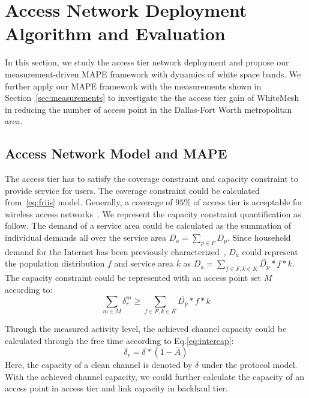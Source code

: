 \section{Access Network Deployment Algorithm and Evaluation}
\label{sec:winmee}

In this section, we study the access tier network deployment and propose our measurement-driven MAPE framework with dynamics 
of white space bands. We further apply our MAPE framework with the measurements shown in Section~\ref{sec:measurements}
to investigate the the access tier gain of WhiteMesh in reducing the number of access point in the Dallas-Fort Worth metropolitan area.

\subsection{Access Network Model and MAPE} 
\label{subsec:winmeemodel}


The access tier has to satisfy the coverage constraint and capacity constraint to provide service for users.
The coverage constraint could be calculated from~\ref{eq:friis} model. Generally, a coverage of $95\%$ of 
access tier is acceptable for wireless access networks~\cite{robinson2010deploying}. We represent the capacity 
constraint quantification as follow. The demand of a service area could be calculated as the 
summation of individual demands all over the service area $D_a=\sum\limits_{p\in P} D_p$. Since household demand 
for the Internet has been previously characterized~\cite{rosston2011household}, $D_a$ could represent the 
population distribution $f$ and service area $k$ as $D_a=\sum\limits_{f \in F,k \in K}\bar{D_p}*f*k$. The capacity 
constraint could be represented with an access point set $M$ according to:
\begin{equation}
\label{eq:nlbound}
\sum_{m \in M}\delta_r^m \ge \sum_{f \in F,k \in K}\bar{D_p}*f*k
\end{equation}


Through the measured activity level, the achieved channel capacity could be calculated through the
free time according to Eq.\ref{eq:intercap}:
\begin{equation}
\label{eq:intercap}
\delta_r=\delta*(1-\bar{A})
\end{equation}
Here, the capacity of a clean channel is denoted by $\delta$ under the protocol model. 
With the achieved channel capacity, we could further calculate the capacity of an access point in access 
tier and link capacity in backhaul tier.



